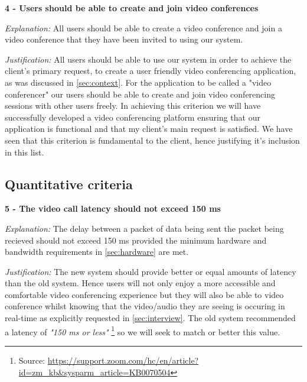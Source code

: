 \vspace{0.2cm}

\textsf{\bfseries 4 - Users should be able to create and 
join video conferences}


\vspace{0.1cm}

\textit{Explanation:}
All users should be able to create a video conference and
join a video conference that they have been invited to 
using our system.

\vspace{0.1cm}

\textit{Justification:}
All users should be able to use our system in order to 
achieve the client's primary request, to create a user
friendly video conferencing application, as was discussed
in \ref{sec:context}. For the application to be called a 
"video conferencer" our users should be able to create and
join video conferencing sessions with other users freely.
In achieving this criterion we will have successfully 
developed a video conferencing platform ensuring that our 
application is functional and that my client's main request
is satisfied. We have seen that this criterion is fundamental
to the client, hence justifying it's inclusion in this list.\\

\subsection{Quantitative criteria}

\textsf{\bfseries 5 - The video call latency should not exceed 150 ms}

\vspace{0.1cm}

\textit{Explanation:}
The delay between a packet of data being sent the packet 
being recieved should not exceed 150 ms provided the minimum
hardware and bandwidth requirements in \ref{sec:hardware} 
are met.

\vspace{0.1cm}

\textit{Justification:}
The new system should provide better or equal amounts of 
latency than the old system. Hence users will not only enjoy
a more accessible and comfortable video conferencing 
experience but they will also be able to video conference 
whilst knowing that the video/audio they are seeing is
occuring in real-time as explicitly requested in 
\ref{sec:interview}. The old system recommended a latency of
\textit{"150 ms or less"} \footnote{Source:
\url{https://support.zoom.com/hc/en/article?id=zm_kb&sysparm_article=KB0070504}} 
so we will seek to match or better this value.

